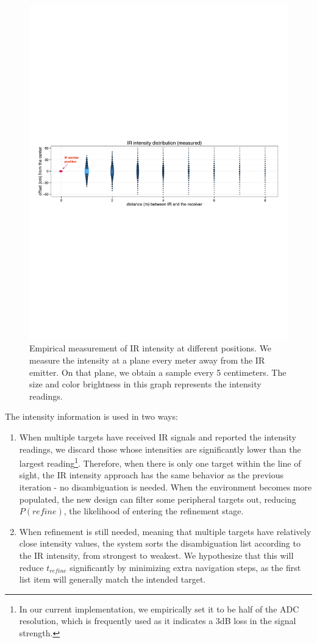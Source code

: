 \begin{figure}[t]
\centering
\includegraphics[width=0.95\columnwidth]{figures/IRIntensityDistribution.pdf}
\caption{Empirical measurement of IR intensity at different positions. We measure the intensity at a plane every meter away from the IR emitter. On that plane, we obtain a sample every 5 centimeters. The size and color brightness in this graph represents the intensity readings.}
\label{fig:measurement}
\end{figure}

The intensity information is used in two ways:
\begin{enumerate}
\item When multiple targets have received IR signals and reported the intensity readings, we discard those whose intensities are significantly lower than the largest reading\footnote{In our current implementation, we empirically set it to be half of the ADC resolution, which is frequently used as it indicates a 3dB loss in the signal strength.}. Therefore, when there is only one target within the line of sight, the IR intensity approach has the same behavior as the previous iteration - no disambiguation is needed. When the environment becomes more populated, the new design can filter some peripheral targets out, reducing $P(refine)$, the likelihood of entering the refinement stage.
\item When refinement is still needed, meaning that multiple targets have relatively close intensity values, the system sorts the disambiguation list according to the IR intensity, from strongest to weakest. We hypothesize that this will reduce $t_{refine}$ significantly by minimizing extra navigation steps, as the first list item will generally match the intended target.
\end{enumerate}

